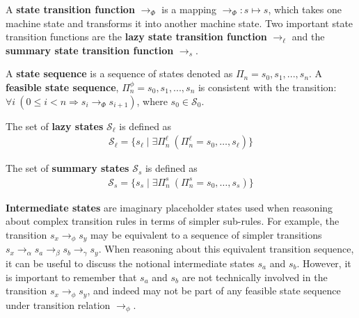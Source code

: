\begin{definition}
A \textbf{state transition function} $\rightarrow_{\Phi}$ is a mapping $\rightarrow_{\Phi} : s \mapsto s$, which takes one machine state and transforms it into another machine state. Two important state transition functions are the \textbf{lazy state transition function} $\rightarrow_\ell$ and the \textbf{summary state transition function} $\rightarrow_s$.
\end{definition}

\begin{definition}
A \textbf{state sequence} is a sequence of states denoted as $\Pi_n = s_0,s_1,...,s_n$. A \textbf{feasible state sequence}, $\Pi_n^\phi = s_0,s_1,...,s_n$ is consistent with the transition: $\forall i\ (0 \leq i < n \Rightarrow s_i \rightarrow_{\Phi} s_{i+1})$, where $s_0\in \mathcal{S}_0$.
\end{definition}

\begin{comment}
\begin{definition}
A \textbf{feasible state sequence} is defined as a sequence of states resulting from repeated application of the state transition relation to some initial state $s_0\in \mathcal{S}_0$: $$\Pi_n = s_0,s_1,...,s_n$$ where the relation $s_i \rightarrow_{\Phi} s_{i+1}$ holds for all $i \in \{ i | 0 \leq i < n \}$
\end{definition}
\end{comment}

\begin{definition}
The set of \textbf{lazy states} $\mathcal{S}_\ell$ is defined as
\begin{align}
\mathcal{S}_\ell = \{s_\ell \mid \exists \Pi_n^\ell\ (\Pi_n^\ell = s_0, \ldots, s_\ell)\}
\end{align}
\end{definition}

\begin{definition}
The set of \textbf{summary states} $\mathcal{S}_s$ is defined as
\begin{align}
\mathcal{S}_s = \{s_s \mid \exists \Pi_n^s\ (\Pi_n^s = s_0, \ldots, s_s)\}
\end{align}
\end{definition}

\begin{definition}
\label{def:interstate}
\textbf{Intermediate states} are imaginary placeholder states used when reasoning about complex transition rules in terms of simpler sub-rules. For example, the transition $s_x \rightarrow_\phi s_y$ may be equivalent to a sequence of simpler transitions $s_x \rightarrow_\alpha s_a \rightarrow_\beta s_b \rightarrow_\gamma s_y$.  When reasoning about this equivalent transition sequence, it can be useful to discuss the notional intermediate states $s_a$ and $s_b$. However, it is important to remember that $s_a$ and $s_b$ are not technically involved in the transition $s_x \rightarrow_\phi s_y$, and indeed may not be part of any feasible state sequence under transition relation $\rightarrow_\phi$.
\end{definition}

